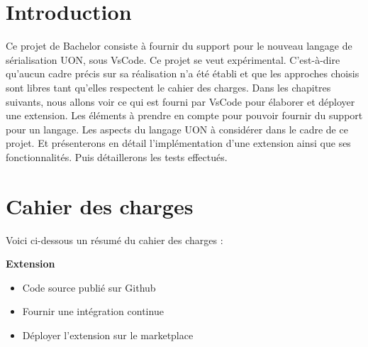 \documentclass[
    iict, %
    il, %
]{heig-tb}
\begin{document}
\maketitle
\frontmatter
\clearemptydoublepage

\preamble
\let\cleardoublepage\clearpage
\authentification
\let\cleardoublepage\clearpage

\begin{abstract}
    
\end{abstract}

\clearemptydoublepage
{
    \tableofcontents
    \let\cleardoublepage\clearpage
    \listoffigures
    \let\cleardoublepage\clearpage
    \listoftables
    \let\cleardoublepage\clearpage
    \listoflistings
}

\printnomenclature
\clearemptydoublepage
{}


\mainmatter
\chapter{Introduction}
Ce projet de Bachelor consiste à fournir du support pour le nouveau langage de sérialisation UON, sous VsCode. Ce projet se veut expérimental. C'est-à-dire qu'aucun cadre précis sur sa réalisation n'a été établi et que les approches choisis sont libres tant qu'elles respectent le cahier des charges.
Dans les chapitres suivants, nous allons voir ce qui est fourni par VsCode pour élaborer et déployer une extension.
Les éléments à prendre en compte pour pouvoir fournir du support pour un langage.
Les aspects du langage UON à considérer dans le cadre de ce projet.
Et présenterons en détail l'implémentation d'une extension ainsi que ses fonctionnalités. Puis détaillerons les tests effectués.

\let\cleardoublepage\clearpage

\chapter{Cahier des charges}
Voici ci-dessous un résumé du cahier des charges :

\textbf{Extension}
\begin{itemize}
    \item Code source publié sur Github
    \item Fournir une intégration continue
    \item Déployer l'extension sur le marketplace
\end{itemize}
\end{document}
